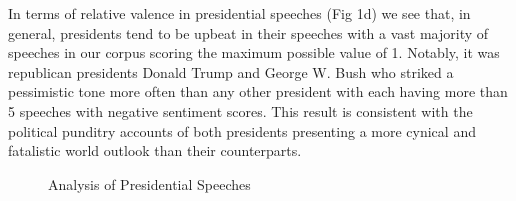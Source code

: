 \documentclass{article}
\begin{document}
{{{In terms of relative valence in presidential speeches (Fig 1d) we see that, in general, presidents tend to be upbeat in their speeches with a vast majority of speeches in our corpus scoring the maximum possible value of 1. Notably, it was republican presidents Donald Trump and George W. Bush who striked a pessimistic tone more often than any other president with each having more than 5 speeches with negative sentiment scores. This result is consistent with the political punditry accounts of both presidents presenting a more cynical and fatalistic world outlook than their counterparts.
}
\newpage
\begin{figure}[H]
	\caption{\label{fig:my-label1} Analysis of Presidential Speeches}
\end{figure}
}
\newpage
}
\end{document}
